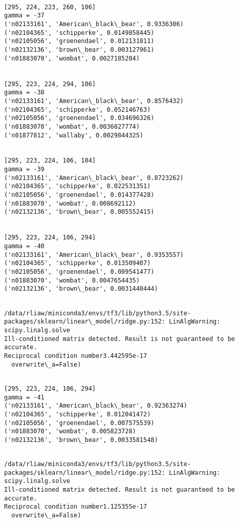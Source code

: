 \documentclass[11pt]{article}
\begin{document}
    \begin{Verbatim}[commandchars=\\\{\}]

[295, 224, 223, 260, 106]
gamma = -37
('n02133161', 'American\_black\_bear', 0.9336306)
('n02104365', 'schipperke', 0.0149858445)
('n02105056', 'groenendael', 0.012131811)
('n02132136', 'brown\_bear', 0.003127961)
('n01883070', 'wombat', 0.0027185204)


[295, 223, 224, 294, 106]
gamma = -38
('n02133161', 'American\_black\_bear', 0.8576432)
('n02104365', 'schipperke', 0.052146763)
('n02105056', 'groenendael', 0.034696326)
('n01883070', 'wombat', 0.0036027774)
('n01877812', 'wallaby', 0.0029844325)


[295, 223, 224, 106, 104]
gamma = -39
('n02133161', 'American\_black\_bear', 0.8723262)
('n02104365', 'schipperke', 0.022531351)
('n02105056', 'groenendael', 0.014377428)
('n01883070', 'wombat', 0.008692112)
('n02132136', 'brown\_bear', 0.005552415)


[295, 223, 224, 106, 294]
gamma = -40
('n02133161', 'American\_black\_bear', 0.9353557)
('n02104365', 'schipperke', 0.013509407)
('n02105056', 'groenendael', 0.009541477)
('n01883070', 'wombat', 0.0047654435)
('n02132136', 'brown\_bear', 0.0031440444)


    \end{Verbatim}

    \begin{Verbatim}[commandchars=\\\{\}]
/data/rliaw/miniconda3/envs/tf3/lib/python3.5/site-packages/sklearn/linear\_model/ridge.py:152: LinAlgWarning: scipy.linalg.solve
Ill-conditioned matrix detected. Result is not guaranteed to be accurate.
Reciprocal condition number3.442595e-17
  overwrite\_a=False)

    \end{Verbatim}

    \begin{Verbatim}[commandchars=\\\{\}]

[295, 223, 224, 106, 294]
gamma = -41
('n02133161', 'American\_black\_bear', 0.92363274)
('n02104365', 'schipperke', 0.012041472)
('n02105056', 'groenendael', 0.007575539)
('n01883070', 'wombat', 0.005823728)
('n02132136', 'brown\_bear', 0.0033581548)


    \end{Verbatim}

    \begin{Verbatim}[commandchars=\\\{\}]
/data/rliaw/miniconda3/envs/tf3/lib/python3.5/site-packages/sklearn/linear\_model/ridge.py:152: LinAlgWarning: scipy.linalg.solve
Ill-conditioned matrix detected. Result is not guaranteed to be accurate.
Reciprocal condition number1.125355e-17
  overwrite\_a=False)

    \end{Verbatim}
\end{document}
